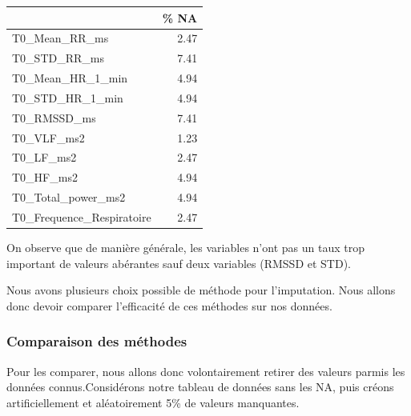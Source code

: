 \documentclass[]{article}
\begin{document}
\begin{table}[H]
\centering
\begin{tabular}{l|r}
\hline
  & \% NA\\
\hline
T0\_Mean\_RR\_ms & 2.47\\
\hline
T0\_STD\_RR\_ms & 7.41\\
\hline
T0\_Mean\_HR\_1\_min & 4.94\\
\hline
T0\_STD\_HR\_1\_min & 4.94\\
\hline
T0\_RMSSD\_ms & 7.41\\
\hline
T0\_VLF\_ms2 & 1.23\\
\hline
T0\_LF\_ms2 & 2.47\\
\hline
T0\_HF\_ms2 & 4.94\\
\hline
T0\_Total\_power\_ms2 & 4.94\\
\hline
T0\_Frequence\_Respiratoire & 2.47\\
\hline
\end{tabular}
\end{table}

On observe que de manière générale, les variables n'ont pas un taux trop
important de valeurs abérantes sauf deux variables (RMSSD et STD).

Nous avons plusieurs choix possible de méthode pour l'imputation. Nous
allons donc devoir comparer l'efficacité de ces méthodes sur nos
données.

\hypertarget{comparaison-des-methodes}{%
\subsubsection{Comparaison des
méthodes}\label{comparaison-des-methodes}}

Pour les comparer, nous allons donc volontairement retirer des valeurs
parmis les données connus.Considérons notre tableau de données sans les
NA, puis créons artificiellement et aléatoirement 5\% de valeurs
manquantes.
\end{document}
